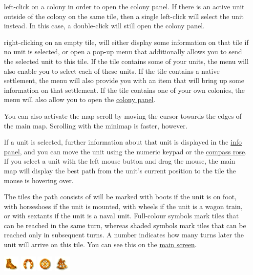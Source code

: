\documentclass[12pt]{book}
\begin{document}
left-click on a colony in order to open the \hyperlink{colony
  panel}{colony panel}. If there is an active unit outside of the
colony on the same tile, then a single left-click will select the unit
instead. In this case, a double-click will still open the colony
panel.

right-clicking on an empty tile, will either display some information
on that tile if no unit is selected, or open a pop-up menu that
additionally allows you to send the selected unit to this tile. If the
tile contains some of your units, the menu will also enable you to
select each of these units. If the tile contains a native settlement,
the menu will also provide you with an item that will bring up some
information on that settlement. If the tile contains one of your own
colonies, the menu will also allow you to open the \hyperlink{colony
panel}{colony panel}.

You can also activate the map scroll by moving the cursor towards the
edges of the main map. Scrolling with the minimap is faster, however.

If a unit is selected, further information about that unit is
displayed in the \hyperlink{info panel}{info panel}, and you can move
the unit using the numeric keypad or the
\hyperlink{compass rose}{compass rose}. If you select a unit with the
left mouse button and drag the mouse, the main map will display the
best path from the unit's current position to the tile the mouse is
hovering over.

The tiles the path consists of will be marked with boots if the unit
is on foot, with horseshoes if the unit is mounted, with wheels if the
unit is a wagon train, or with sextants if the unit is a naval
unit. Full-colour symbols mark tiles that can be reached in the same
turn, whereas shaded symbols mark tiles that can be reached only in
subsequent turns. A number indicates how many turns later the unit
will arrive on this tile. You can see this on the \hyperlink{main
  screen}{main screen}.


  \begin{center}
    \includegraphics{images/path-foot.png}
    \includegraphics{images/path-horse.png}
    \includegraphics{images/path-wagon.png}
    \includegraphics{images/path-naval.png}
  \end{center}
\end{document}
